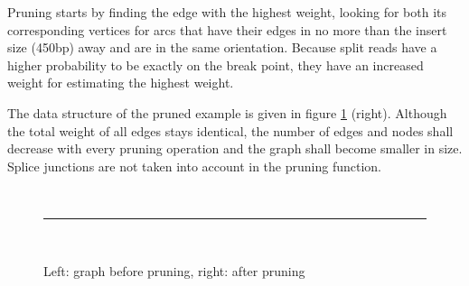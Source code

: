 \documentclass{article}
\theoremstyle{definition}
\begin{document}
Pruning starts by finding the edge with the highest weight, looking for both its corresponding vertices for arcs that have their edges in no more than the insert size (450bp) away and are in the same orientation.
Because split reads have a higher probability to be exactly on the break point, they have an increased weight for estimating the highest weight.

The data structure of the pruned example is given in figure \ref{fig:pruning_graph} (right).
Although the total weight of all edges stays identical, the number of edges and nodes shall decrease with every pruning operation and the graph shall become smaller in size.
Splice junctions are not taken into account in the pruning function.

\begin{figure}
\begin{center}
 \\
\rule[0.5ex]{\textwidth}{0.4pt}
\\
\caption{Left: graph before pruning, right: after pruning}
\label{fig:pruning_graph}
\end{center}
\end{figure}
\end{document}
